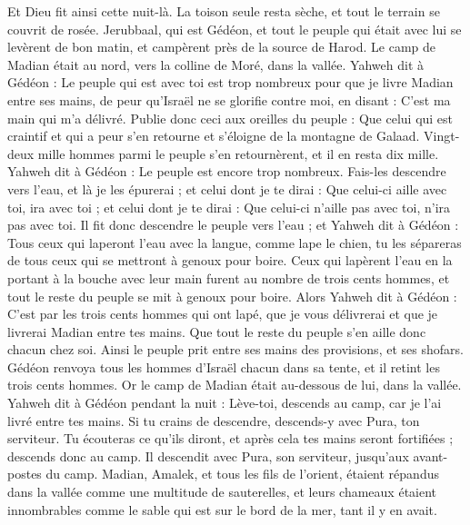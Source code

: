 \begin{multicols}{2}
Et Dieu fit ainsi cette nuit-là. La toison seule resta sèche, et tout le terrain se couvrit de rosée.
\VerseOne{}Jerubbaal, qui est Gédéon, et tout le peuple qui était avec lui se levèrent de bon matin, et campèrent près de la source de Harod.  Le camp de Madian était au nord, vers la colline de Moré, dans la vallée.
Yahweh dit à Gédéon : Le peuple qui est avec toi est trop nombreux pour que je livre Madian entre ses mains, de peur qu'Israël ne se glorifie contre moi, en disant : C’est ma main qui m'a délivré.
Publie donc ceci aux oreilles du peuple : Que celui qui est craintif et qui a peur s’en retourne et s’éloigne de la montagne de Galaad. Vingt-deux mille hommes parmi le peuple s'en retournèrent, et il en resta dix mille.
Yahweh dit à Gédéon : Le peuple est encore trop nombreux. Fais-les descendre vers l'eau, et là je les épurerai ; et celui dont je te dirai : Que celui-ci aille avec toi, ira avec toi ; et celui dont je te dirai : Que celui-ci n’aille pas avec toi, n’ira pas avec toi.
Il fit donc descendre le peuple vers l'eau ; et Yahweh dit à Gédéon : Tous ceux qui laperont l'eau avec la langue, comme lape le chien, tu les sépareras de tous ceux qui se mettront à genoux pour boire.
Ceux qui lapèrent l’eau en la portant à la bouche avec leur main furent au nombre de trois cents hommes, et tout le reste du peuple se mit à genoux pour boire.
Alors Yahweh dit à Gédéon : C’est par les trois cents hommes qui ont lapé, que je vous délivrerai et que je livrerai Madian entre tes mains. Que tout le reste du peuple s'en aille donc chacun chez soi.
Ainsi le peuple prit entre ses mains des provisions, et ses shofars. Gédéon renvoya tous les hommes d'Israël chacun dans sa tente, et il retint les trois cents hommes. Or le camp de Madian était au-dessous de lui, dans la vallée.
Yahweh dit à Gédéon pendant la nuit : Lève-toi, descends au camp, car je l'ai livré entre tes mains.
Si tu crains de descendre, descends-y avec Pura, ton serviteur.
Tu écouteras ce qu'ils diront, et après cela tes mains seront fortifiées ; descends donc au camp. Il descendit avec Pura, son serviteur, jusqu'aux avant-postes du camp.
Madian, Amalek, et tous les fils de l’orient, étaient répandus dans la vallée comme une multitude de sauterelles, et leurs chameaux étaient innombrables comme le sable qui est sur le bord de la mer, tant il y en avait.

\end{multicols}
